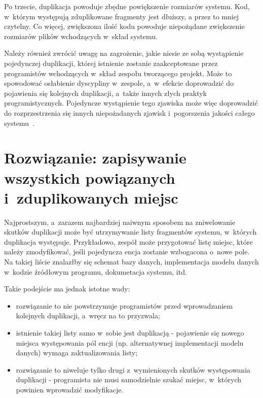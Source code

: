 Po trzecie, duplikacja powoduje zbędne powiększenie rozmiarów systemu.
Kod, w~którym występują zduplikowane fragmenty jest dłuższy, a przez to mniej czytelny.
Co więcej, zwiększona ilość kodu powoduje niepożądane zwiększenie rozmiarów plików wchodzących w~skład systemu.

Należy również zwrócić uwagę na zagrożenie, jakie niesie ze sobą wystąpienie pojedynczej duplikacji, której istnienie zostanie zaakceptowane przez programistów wchodzących w~skład zespołu tworzącego projekt.
Może to spowodować osłabienie dyscypliny w~zespole, a~w~efekcie doprowadzić do pojawienia się kolejnych duplikacji, a~także innych złych praktyk programistycznych.
Pojedyncze wystąpienie tego zjawiska może więc doprowadzić do rozprzestrzenia się innych niepożadanych zjawisk i~pogorszenia jakości całego systemu~\cite{prag_prog:entropy}.



\section{Rozwiązanie: zapisywanie wszystkich powiązanych i~zduplikowanych miejsc}

Najprostszym, a~zarazem najbardziej naiwnym sposobem na zniwelowanie skutków duplikacji może być utrzymywanie listy fragmentów systemu, w~których duplikacja występuje.
Przykładowo, zespół może przygotować listę miejsc, które należy zmodyfikować, jeśli pojedyncza encja zostanie wzbogacona o~nowe pole.
Na takiej liście znalazłby się schemat bazy danych, implementacja modelu danych w~kodzie źródłowym programu, dokumetacja systemu, itd.

Takie podejście ma jednak istotne wady:

\begin{itemize}
 \item rozwiązanie to nie powstrzymuje programistów przed wprowadzaniem kolejnych duplikacji, a~wręcz na to przyzwala;
 \item istnienie takiej listy samo w~sobie jest duplikacją - pojawienie się nowego miejsca występowania pól encji (np. alternatywnej implementacji modelu danych) wymaga zaktualizowania listy;
 \item rozwiązanie to niweluje tylko drugi z~wymienionych skutków występowania duplikacji - programista nie musi samodzielnie szukać miejsc, w~których powinien wprowadzić modyfikacje.
\end{itemize}



